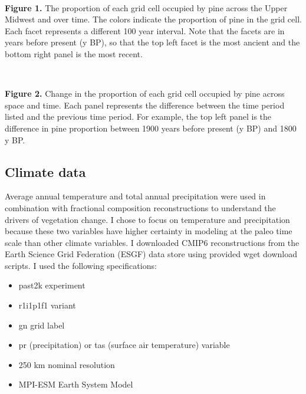 \documentclass[11pt]{article}
\providecommand{\tightlist}{%
      \setlength{\itemsep}{0pt}\setlength{\parskip}{0pt}}
\begin{document}
            
    
    \begin{center}
    \end{center}
    { \hspace*{\fill} \\}
    

    \textbf{Figure 1.} The proportion of each grid cell occupied by pine
across the Upper Midwest and over time. The colors indicate the
proportion of pine in the grid cell. Each facet represents a different
100 year interval. Note that the facets are in years before present (y
BP), so that the top left facet is the most ancient and the bottom right
panel is the most recent.
 
            
    
    \begin{center}
    \end{center}
    { \hspace*{\fill} \\}
    

    \textbf{Figure 2.} Change in the proportion of each grid cell occupied
by pine across space and time. Each panel represents the difference
between the time period listed and the previous time period. For
example, the top left panel is the difference in pine proportion between
1900 years before present (y BP) and 1800 y BP.

    \hypertarget{climate-data}{%
\subsection{Climate data}\label{climate-data}}

Average annual temperature and total annual precipitation were used in
combination with fractional composition reconstructions to understand
the drivers of vegetation change. I chose to focus on temperature and
precipitation because these two variables have higher certainty in
modeling at the paleo time scale than other climate variables. I
downloaded CMIP6 reconstructions from the Earth Science Grid Federation
(ESGF) data store using provided wget download scripts. I used the
following specifications:

\begin{itemize}
\tightlist
\item
  past2k experiment
\item
  r1i1p1f1 variant
\item
  gn grid label
\item
  pr (precipitation) or tas (surface air temperature) variable
\item
  250 km nominal resolution
\item
  MPI-ESM Earth System Model
\end{itemize}
\end{document}
